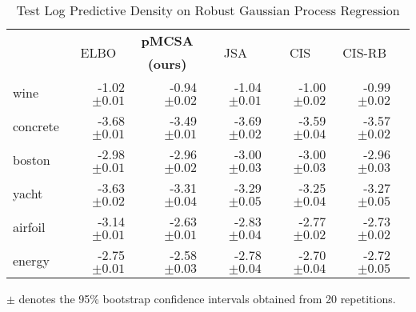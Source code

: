
\begin{table*}
  \centering
  \caption{Test Log Predictive Density on Robust Gaussian Process Regression}\label{table:gp}
  \setlength{\tabcolsep}{4pt}
  \begin{threeparttable}
  \begin{tabular}{lrrrrrr}
    \toprule
    & \multicolumn{1}{c}{\multirow{2}{*}{ELBO}} & \multicolumn{1}{c}{\multirow{1}{*}{\textbf{pMCSA}}} & \multicolumn{1}{c}{\multirow{2}{*}{JSA}} & \multicolumn{1}{c}{\multirow{2}{*}{CIS}} & \multicolumn{1}{c}{\multirow{2}{*}{CIS-RB}} \\ %
    & & \multicolumn{1}{c}{\textbf{(ours)}} & & & \\
    \midrule
    wine & {-1.02 {\scriptsize{\(\pm 0.01\)}}} & {-0.94 {\scriptsize{\(\pm 0.02\)}}} & {-1.04 {\scriptsize{\(\pm 0.01\)}}} & {-1.00 {\scriptsize{\(\pm 0.02\)}}} & {-0.99 {\scriptsize{\(\pm 0.02\)}}} \\
    concrete  & {-3.68 {\scriptsize{\(\pm 0.01\)}}} & {-3.49 {\scriptsize{\(\pm 0.01\)}}} & {-3.69 {\scriptsize{\(\pm 0.02\)}}} & {-3.59 {\scriptsize{\(\pm 0.04\)}}} & {-3.57 {\scriptsize{\(\pm 0.02\)}}} \\
    boston  & {-2.98 {\scriptsize{\(\pm 0.01\)}}} & {-2.96 {\scriptsize{\(\pm 0.02\)}}} & {-3.00 {\scriptsize{\(\pm 0.03\)}}} & {-3.00 {\scriptsize{\(\pm 0.03\)}}} & {-2.96 {\scriptsize{\(\pm 0.03\)}}} \\
    yacht  & {-3.63 {\scriptsize{\(\pm 0.02\)}}} & {-3.31 {\scriptsize{\(\pm 0.04\)}}} & {-3.29 {\scriptsize{\(\pm 0.05\)}}} & {-3.25 {\scriptsize{\(\pm 0.04\)}}} & {-3.27 {\scriptsize{\(\pm 0.05\)}}} \\
    airfoil  & {-3.14 {\scriptsize{\(\pm 0.01\)}}} & {-2.63 {\scriptsize{\(\pm 0.01\)}}} & {-2.83 {\scriptsize{\(\pm 0.04\)}}} & {-2.77 {\scriptsize{\(\pm 0.02\)}}} & {-2.73 {\scriptsize{\(\pm 0.02\)}}}\\
    energy  & {-2.75 {\scriptsize{\(\pm 0.01\)}}} & {-2.58 {\scriptsize{\(\pm 0.03\)}}} & {-2.78 {\scriptsize{\(\pm 0.04\)}}} & {-2.70 {\scriptsize{\(\pm 0.04\)}}} & {-2.72 {\scriptsize{\(\pm 0.05\)}}} \\\bottomrule
  \end{tabular}
  \begin{tablenotes}
    \item[]{\footnotesize \(\pm\) denotes the 95\% bootstrap confidence intervals obtained from 20 repetitions.}
  \end{tablenotes}
  \end{threeparttable}
\end{table*}

